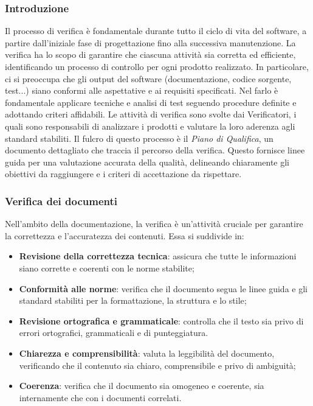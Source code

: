 \subsubsection{Introduzione}
Il processo di verifica è fondamentale durante tutto il ciclo di vita del software, a partire dall'iniziale fase
di progettazione fino alla successiva manutenzione. La verifica ha lo scopo di garantire che ciascuna attività
sia corretta ed efficiente, identificando un processo di controllo per ogni prodotto realizzato. In particolare, ci si preoccupa che gli output
del software (documentazione, codice sorgente, test...) siano conformi alle aspettative e ai requisiti specificati. Nel farlo è fondamentale
applicare tecniche e analisi di test seguendo procedure definite e adottando criteri affidabili.
Le attività di verifica sono svolte dai Verificatori, i quali sono responsabili di analizzare i prodotti e valutare la loro aderenza agli standard
stabiliti. Il fulcro di questo processo è il \textit{Piano di Qualifica}, un documento dettagliato che traccia il percorso della verifica.
Questo fornisce linee guida per una valutazione accurata della qualità, delineando chiaramente gli obiettivi da raggiungere e i criteri di
accettazione da rispettare.

\subsubsection{Verifica dei documenti} \label{verifica_dei_documenti}
Nell'ambito della documentazione, la verifica è un'attività cruciale per garantire la correttezza e l'accuratezza dei contenuti. Essa si suddivide in:
\begin{itemize}
	\item \textbf{Revisione della correttezza tecnica}: assicura che tutte le informazioni siano corrette e coerenti con le norme stabilite;
	\item \textbf{Conformità alle norme}: verifica che il documento segua le linee guida e gli standard
	      stabiliti per la formattazione, la struttura e lo stile;
	\item \textbf{Revisione ortografica e grammaticale}: controlla che il testo sia privo di errori ortografici, grammaticali e di punteggiatura.
	\item \textbf{Chiarezza e comprensibilità}: valuta la leggibilità del documento, verificando che il contenuto sia chiaro, comprensibile e privo di ambiguità;
	\item \textbf{Coerenza}: verifica che il documento sia omogeneo e coerente, sia internamente che con i documenti correlati.
\end{itemize}

